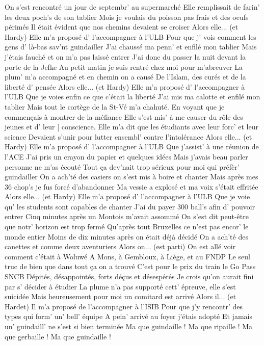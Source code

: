 \footnotemark
[ititle={Ma Que Guindaille}, tu={Siffler sur la colline (Joe Dassin)}]

\beginverse
{}
On s'est rencontré un jour de septembr' au supermarché
Elle remplissait de farin' les deux poch's de son tablier
Mois je voulais du poisson pas frais et des oeufs périmés
Il était évident que nos chemins devaient se croiser
Alors elle... (et Hardy)
Elle m'a proposé d' l'accompagner à l'ULB
Pour que j' vois comment les gens d' là-bas sav'nt guindailler
J'ai chaussé ma penn' et enfilé mon tablier
Mais j'étais fauché et on m'a pas laissé entrer
\endverse
\beginverse
J'ai donc du passer la nuit devant la porte de la Jefke
Au petit matin je suis rentré chez moi pour m'abreuver
La plum' m'a accompagné et en chemin on a causé
De l'Islam, des curés et de la liberté d' pensée
Alors elle... (et Hardy)
Elle m'a proposé d' l'accompagner à l'ULB
Que je voies enfin ce que c'était la liberté
J'ai mis ma calotte et enfilé mon tablier
Mais tout le cortège de la St-Vé m'a chahuté.
\endverse
\beginverse
En voyant que je commençais à montrer de la méfiance
Elle s'est mis' à me causer du rôle des jeunes et d' leur
[ conscience.
Elle m'a dit que les étudiants avec leur forc' et leur science
Devaient s'unir pour lutter ensembl' contre l'intolérance
Alors elle... (et Hardy)
Elle m'a proposé d' l'accompagner à l'ULB
Que j'assist' à une réunion de l'ACE
J'ai pris un crayon du papier et quelques idées
Mais j'avais beau parler personne ne m'as écouté
\endverse
\beginverse
Tout ça dev'nait trop sérieux pour moi qui préfèr' guindailler
On a ach'té des casiers on s'est mis à boire et chanter
Mais après mes 36 chop's je fus forcé d'abandonner
Ma vessie a explosé et ma voix s'était effritée
Alors elle... (et Hardy)
Elle m'a proposé d' l'accompagner à l'ULB
Que je voie qu' les students sont capables de chanter
J'ai du payer 300 ball's afin d' pouvoir entrer
Cinq minutes après un Montois m'avait assommé
\endverse
\beginverse
On s'est dit peut-être que notr' horizon est trop fermé
Qu'après tout Bruxelles ce n'est pas encor' le monde entier
Moins de dix minutes après on était déjà décidé
On a ach'té des canettes et comme deux aventuriers
Alors on... (est parti)
On est allé voir comment c'était à Woluwé
A Mons, à Gembloux, à Liège, et au FNDP
Le seul truc de bien que dans tout ça on a trouvé
C'est pour le prix du train le Go Pass SNCB
\endverse
\beginverse
Dépités, désappointés, forts déçus et désespérés
Je crois qu'on aurait fini par s' décider à étudier
La plume n'a pas supporté cett' épreuve, elle s'est suicidée
Mais heureusement pour moi un comitard est arrivé
Alors il... (et Hardet)
Il m'a proposé de l'accompagner à l'ISIB
Pour que j'y rencontr' des types qui form' un' bell' équipe
A pein' arrivé au foyer j'étais adopté
Et jamais un' guindaill' ne s'est si bien terminée
Ma que guindaille ! Ma que ripaille !
Ma que gerbaille ! Ma que guindaille !
\endverse
\endsong